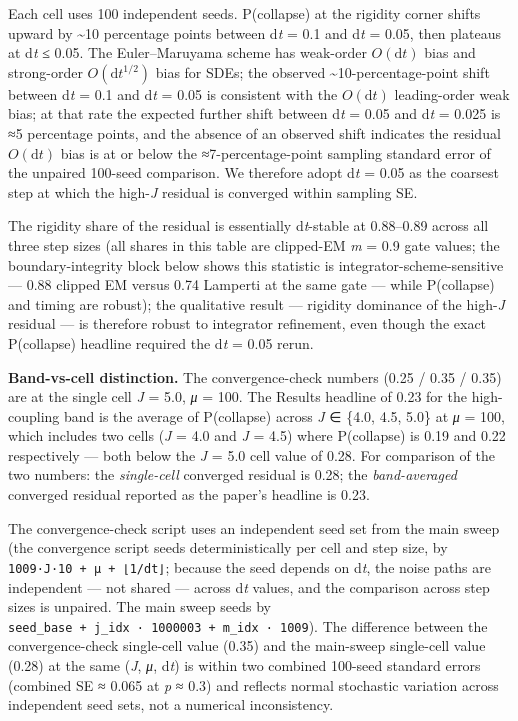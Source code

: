 \documentclass[11pt,letterpaper]{article}
\begin{document}
Each cell uses 100 independent seeds. P(collapse) at the rigidity corner shifts upward by \textasciitilde10 percentage points between d\emph{t} = 0.1 and d\emph{t} = 0.05, then plateaus at d\emph{t} ≤ 0.05. The Euler--Maruyama scheme has weak-order \(O(\mathrm{d}t)\) bias and strong-order \(O(\mathrm{d}t^{1/2})\) bias for SDEs; the observed \textasciitilde10-percentage-point shift between d\emph{t} = 0.1 and d\emph{t} = 0.05 is consistent with the \(O(\mathrm{d}t)\) leading-order weak bias; at that rate the expected further shift between d\emph{t} = 0.05 and d\emph{t} = 0.025 is ≈5 percentage points, and the absence of an observed shift indicates the residual \(O(\mathrm{d}t)\) bias is at or below the ≈7-percentage-point sampling standard error of the unpaired 100-seed comparison. We therefore adopt d\emph{t} = 0.05 as the coarsest step at which the high-\emph{J} residual is converged within sampling SE.

The rigidity share of the residual is essentially d\emph{t}-stable at 0.88--0.89 across all three step sizes (all shares in this table are clipped-EM \textbar{}\emph{m}\textbar{} = 0.9 gate values; the boundary-integrity block below shows this statistic is integrator-scheme-sensitive --- 0.88 clipped EM versus 0.74 Lamperti at the same gate --- while P(collapse) and timing are robust); the qualitative result --- rigidity dominance of the high-\emph{J} residual --- is therefore robust to integrator refinement, even though the exact P(collapse) headline required the d\emph{t} = 0.05 rerun.

\textbf{Band-vs-cell distinction.} The convergence-check numbers (0.25 / 0.35 / 0.35) are at the single cell \emph{J} = 5.0, \emph{μ} = 100. The Results headline of 0.23 for the high-coupling band is the average of P(collapse) across \emph{J} ∈ \{4.0, 4.5, 5.0\} at \emph{μ} = 100, which includes two cells (\emph{J} = 4.0 and \emph{J} = 4.5) where P(collapse) is 0.19 and 0.22 respectively --- both below the \emph{J} = 5.0 cell value of 0.28. For comparison of the two numbers: the \emph{single-cell} converged residual is 0.28; the \emph{band-averaged} converged residual reported as the paper's headline is 0.23.

The convergence-check script uses an independent seed set from the main sweep (the convergence script seeds deterministically per cell and step size, by \texttt{1009·J·10\ +\ μ\ +\ ⌊1/dt⌋}; because the seed depends on d\emph{t}, the noise paths are independent --- not shared --- across d\emph{t} values, and the comparison across step sizes is unpaired. The main sweep seeds by \texttt{seed\_base\ +\ j\_idx\ ·\ 1000003\ +\ m\_idx\ ·\ 1009}). The difference between the convergence-check single-cell value (0.35) and the main-sweep single-cell value (0.28) at the same (\emph{J}, \emph{μ}, d\emph{t}) is within two combined 100-seed standard errors (combined SE ≈ 0.065 at \emph{p} ≈ 0.3) and reflects normal stochastic variation across independent seed sets, not a numerical inconsistency.
\end{document}
